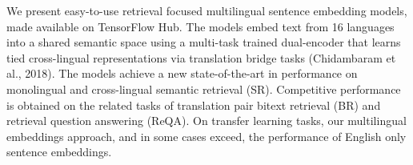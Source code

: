 We present easy-to-use retrieval focused multilingual sentence embedding models, made available on TensorFlow Hub. The models embed text from 16 languages into a shared semantic space using a multi-task trained dual-encoder that learns tied cross-lingual representations via translation bridge tasks  (Chidambaram et al., 2018). The models achieve a new state-of-the-art in performance on monolingual and cross-lingual semantic retrieval (SR). Competitive performance is obtained on the related tasks of translation pair bitext retrieval (BR) and retrieval question answering (ReQA). On transfer learning tasks, our multilingual embeddings approach, and in some cases exceed, the performance of English only sentence embeddings.
